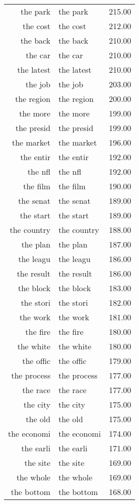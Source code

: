\begin{table}[ht]
\begin{tabular}{rlr}
  the park & the park & 215.00 \\ 
  the cost & the cost & 212.00 \\ 
  the back & the back & 210.00 \\ 
  the car & the car & 210.00 \\ 
  the latest & the latest & 210.00 \\ 
  the job & the job & 203.00 \\ 
  the region & the region & 200.00 \\ 
  the more & the more & 199.00 \\ 
  the presid & the presid & 199.00 \\ 
  the market & the market & 196.00 \\ 
  the entir & the entir & 192.00 \\ 
  the nfl & the nfl & 192.00 \\ 
  the film & the film & 190.00 \\ 
  the senat & the senat & 189.00 \\ 
  the start & the start & 189.00 \\ 
  the country & the country & 188.00 \\ 
  the plan & the plan & 187.00 \\ 
  the leagu & the leagu & 186.00 \\ 
  the result & the result & 186.00 \\ 
  the block & the block & 183.00 \\ 
  the stori & the stori & 182.00 \\ 
  the work & the work & 181.00 \\ 
  the fire & the fire & 180.00 \\ 
  the white & the white & 180.00 \\ 
  the offic & the offic & 179.00 \\ 
  the process & the process & 177.00 \\ 
  the race & the race & 177.00 \\ 
  the city & the city & 175.00 \\ 
  the old & the old & 175.00 \\ 
  the economi & the economi & 174.00 \\ 
  the earli & the earli & 171.00 \\ 
  the site & the site & 169.00 \\ 
  the whole & the whole & 169.00 \\ 
  the bottom & the bottom & 168.00 \\ 

\end{tabular}
\end{table}
